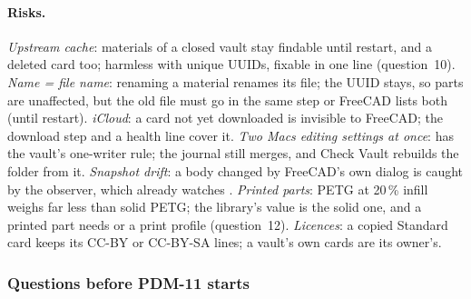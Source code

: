 \paragraph{Risks.} \emph{Upstream cache}: materials of a closed vault stay findable until restart, and a deleted card too;
harmless with unique UUIDs, fixable in one line (question~10). \emph{Name = file name}: renaming a material renames its
file; the UUID stays, so parts are unaffected, but the old file must go in the same step or FreeCAD lists both (until
restart). \emph{iCloud}: a card not yet downloaded is invisible to FreeCAD; the download step and a health line cover it.
\emph{Two Macs editing settings at once}:  has the vault's one-writer rule; the journal still merges, and
Check Vault rebuilds the folder from it. \emph{Snapshot drift}: a body changed by FreeCAD's own dialog is caught by the
observer, which already watches . \emph{Printed parts}: PETG at 20\,\% infill weighs far less than
solid PETG; the library's value is the solid one, and a printed part needs  or a print profile
(question~12). \emph{Licences}: a copied Standard card keeps its CC-BY or CC-BY-SA lines; a vault's own cards are its
owner's.

\subsubsection*{Questions before PDM-11 starts}

